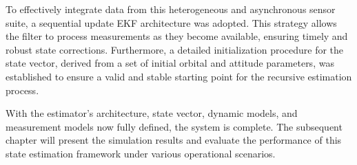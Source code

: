 \noindent
To effectively integrate data from this heterogeneous and asynchronous sensor suite, a sequential update EKF architecture was adopted. This strategy allows the filter to process measurements as 
they become available, ensuring timely and robust state corrections. Furthermore, a detailed initialization procedure for the state vector, derived from a set of initial orbital and attitude parameters, 
was established to ensure a valid and stable starting point for the recursive estimation process.
\vspace{0.5cm}

\noindent
With the estimator's architecture, state vector, dynamic models, and measurement models now fully defined, the system is complete. The subsequent chapter will present the simulation results and 
evaluate the performance of this state estimation framework under various operational scenarios.
